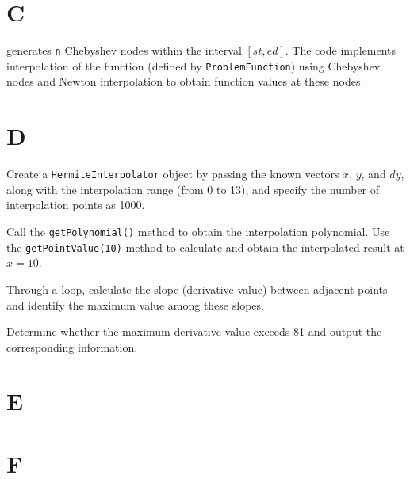 \documentclass[a4paper]{article}
\begin{document}
\section{C}

generates \texttt{n} Chebyshev nodes within the interval \([st, ed]\). 
The code implements interpolation of the function (defined by \texttt{ProblemFunction}) using Chebyshev nodes and Newton interpolation to obtain function values at these nodes

\section{D}

Create a \texttt{HermiteInterpolator} object by passing the known vectors \(x\), \(y\), and \(dy\), along with the interpolation range (from 0 to 13), and specify the number of interpolation points as 1000.

Call the \texttt{getPolynomial()} method to obtain the interpolation polynomial.  
Use the \texttt{getPointValue(10)} method to calculate and obtain the interpolated result at \(x = 10\).


Through a loop, calculate the slope (derivative value) between adjacent points and identify the maximum value among these slopes.

Determine whether the maximum derivative value exceeds 81 and output the corresponding information.


\section{E}

\section{F}

\end{document}
